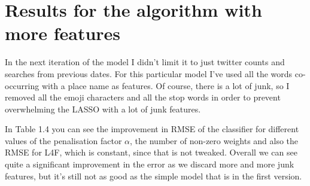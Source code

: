 \documentclass[minf,frontabs,twoside,singlespacing,parskip]{infthesis}
\begin{document}
\newpage
\section{Results for the algorithm with more features}

In the next iteration of the model I didn't limit it to just twitter counts and searches from previous dates. For this particular model I've used all the words co-occurring with a place name as features. Of course, there is a lot of junk, so I removed all the emoji characters and all the stop words in order to prevent overwhelming the LASSO with a lot of junk features.

In Table 1.4 you can see the improvement in RMSE of the classifier for different values of the penalisation factor $\alpha$, the number of non-zero weights and also the RMSE for L4F, which is constant, since that is not tweaked. Overall we can see quite a significant improvement in the error as we discard more and more junk features, but it's still not as good as the simple model that is in the first version. 
\end{document}
